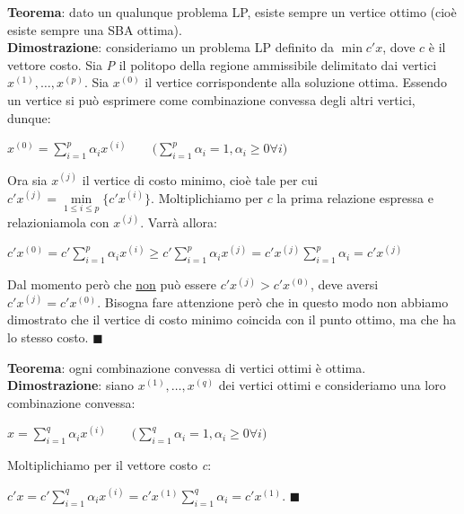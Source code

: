\documentclass[11pt, oneside]{book}
\begin{document}
{\bf Teorema}: dato un qualunque problema LP, esiste sempre un vertice
ottimo (cio\`e esiste sempre una SBA ottima).\\ {\bf Dimostrazione}:
consideriamo un problema LP definito da $\min{c'x}$, dove $c$ \`e il
vettore costo. Sia {\em P} il politopo della regione ammissibile
delimitato dai vertici $x^{(1)},\dots,x^{(p)}$. Sia $x^{(0)}$ il
vertice corrispondente alla soluzione ottima. Essendo un vertice si
pu\`o esprimere come combinazione convessa degli altri vertici,
dunque:

\begin{center}
$x^{(0)} = \sum_{i=1}^{p} \alpha_i x^{(i)}\qquad \biggr (
  \sum\limits_{i=1}^p \alpha_i = 1, \alpha_i
  \geq0 \forall i \biggr )$  
\end{center}

Ora sia $x^{(j)}$ il vertice di costo minimo, cio\`e tale per cui
$c'x^{(j)} = \min\limits_{1\leq i\leq p}\{
c'x^{(i)}\}$. Moltiplichiamo per $c$ la prima relazione
espressa e relazioniamola con $x^{(j)}$. Varr\`a allora:

\begin{center}
$c'x^{(0)} = c'\sum\limits_{i=1}^p \alpha_i x^{(i)} \geq
  c'\sum\limits_{i=1}^p \alpha_i x^{(j)} =
  c'x^{(j)}\sum\limits_{i=1}^p \alpha_i = c'x^{(j)}$  
\end{center}

Dal momento per\`o che \underline{non} pu\`o essere $c'x^{(j)} >
c'x^{(0)}$, deve aversi $c'x^{(j)} = c'x^{(0)}$. Bisogna fare
attenzione per\`o che in questo modo non abbiamo dimostrato che il
vertice di costo minimo coincida con il punto ottimo, ma che ha lo
stesso costo. $\blacksquare$

\par\bigskip

{\bf Teorema}: ogni combinazione convessa di vertici ottimi \`e
ottima.\\
{\bf Dimostrazione}: siano $x^{(1)},\dots,x^{(q)}$ dei vertici ottimi
e consideriamo una loro combinazione convessa:

\begin{center}
$x = \sum\limits_{i=1}^q \alpha_i x^{(i)} \qquad \biggr (
  \sum\limits_{i=1}^q \alpha_i = 1, \alpha_i \geq 0 \forall i \biggr
  )$
\end{center}

Moltiplichiamo per il vettore costo {\em c}:

\begin{center}
$c'x = c' \sum\limits_{i=1}^q \alpha_i x^{(i)} = c'x^{(1)}
  \sum\limits_{i=1}^q \alpha_i = c'x^{(1)}$. $\blacksquare$
\end{center}
\end{document}
